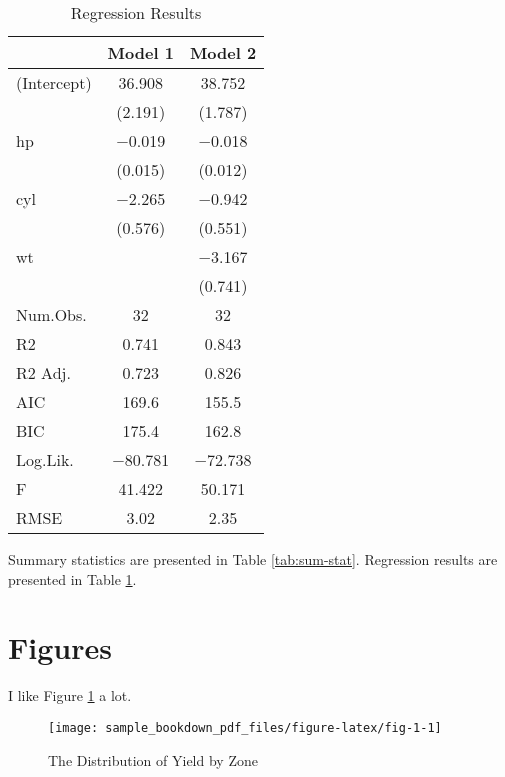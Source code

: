 \documentclass[
  12pt,
]{article}
\begin{document}
\begin{table}[H]

\caption{\label{tab:regtable}Regression Results}
\centering
\begin{tabular}[t]{lcc}
\toprule
  & Model 1 & Model 2\\
\midrule
(Intercept) & \num{36.908} & \num{38.752}\\
 & (\num{2.191}) & (\num{1.787})\\
hp & \num{-0.019} & \num{-0.018}\\
 & (\num{0.015}) & (\num{0.012})\\
cyl & \num{-2.265} & \num{-0.942}\\
 & (\num{0.576}) & (\num{0.551})\\
wt &  & \num{-3.167}\\
 &  & (\num{0.741})\\
\midrule
Num.Obs. & \num{32} & \num{32}\\
R2 & \num{0.741} & \num{0.843}\\
R2 Adj. & \num{0.723} & \num{0.826}\\
AIC & \num{169.6} & \num{155.5}\\
BIC & \num{175.4} & \num{162.8}\\
Log.Lik. & \num{-80.781} & \num{-72.738}\\
F & \num{41.422} & \num{50.171}\\
RMSE & \num{3.02} & \num{2.35}\\
\bottomrule
\end{tabular}
\end{table}

Summary statistics are presented in Table \ref{tab:sum-stat}. Regression results are presented in Table \ref{tab:regtable}.

\newpage

\hypertarget{figures}{%
\section{Figures}\label{figures}}

I like Figure \ref{fig:fig-1} a lot.

\begin{figure}

{\centering \texttt{[image: sample\_bookdown\_pdf\_files/figure-latex/fig-1-1]} 

}

\caption{The Distribution of Yield by Zone}\label{fig:fig-1}
\end{figure}
\end{document}
